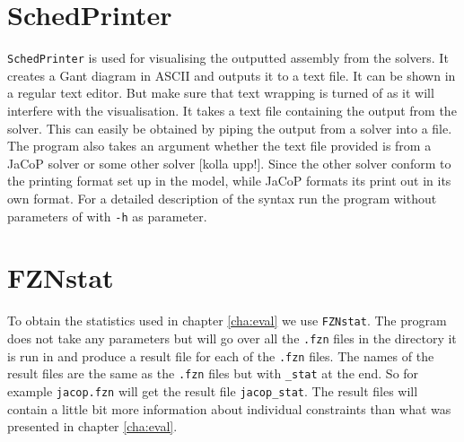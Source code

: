 \section{SchedPrinter}
\texttt{SchedPrinter} is used for visualising the outputted assembly from the solvers. It creates a Gant diagram in ASCII and outputs it to a text file. It can be shown in a regular text editor. But make sure that text wrapping is turned of as it will interfere with the visualisation. It takes a text file containing the output from the solver. This can easily be obtained by piping the output from a solver into a file. The program also takes an argument whether the text file provided is from a JaCoP solver or some other solver [kolla upp!]. Since the other solver conform to the printing format set up in the model, while JaCoP formats its print out in its own format. For a detailed description of the syntax run the program without parameters of with \texttt{-h} as parameter.

\section{FZNstat}
To obtain the statistics used in chapter \ref{cha:eval} we use \texttt{FZNstat}. The program does not take any parameters but will go over all the \texttt{.fzn} files in the directory it is run in and produce a result file for each of the \texttt{.fzn} files. The names of the result files are the same as the \texttt{.fzn} files but with \texttt{\_stat} at the end. So for example \texttt{jacop.fzn} will get the result file \texttt{jacop\_stat}. The result files will contain a little bit more information about individual constraints than what was presented in chapter \ref{cha:eval}.